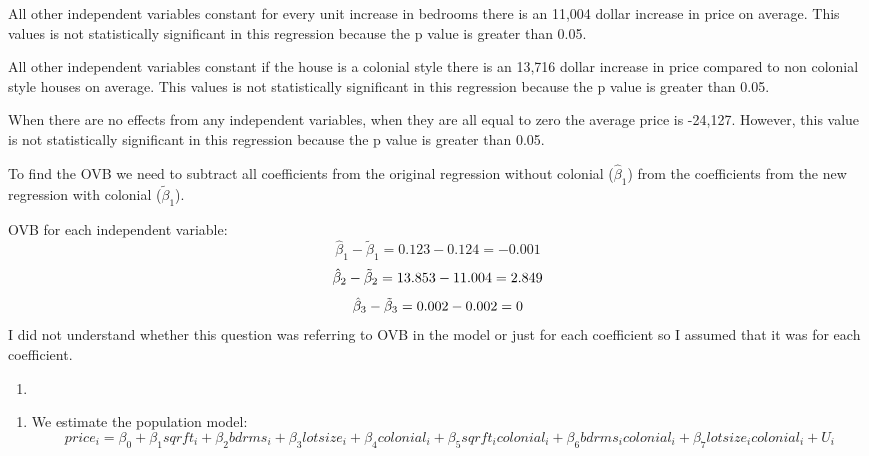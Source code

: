 \documentclass[
  12pt,
  landscape]{article}
\providecommand{\tightlist}{%
  \setlength{\itemsep}{0pt}\setlength{\parskip}{0pt}}
\begin{document}
All other independent variables constant for every unit increase in
bedrooms there is an 11,004 dollar increase in price on average. This
values is not statistically significant in this regression because the p
value is greater than 0.05.

All other independent variables constant if the house is a colonial
style there is an 13,716 dollar increase in price compared to non
colonial style houses on average. This values is not statistically
significant in this regression because the p value is greater than 0.05.

When there are no effects from any independent variables, when they are
all equal to zero the average price is -24,127. However, this value is
not statistically significant in this regression because the p value is
greater than 0.05.

To find the OVB we need to subtract all coefficients from the original
regression without colonial (\(\hat\beta_1\)) from the coefficients from
the new regression with colonial (\(\tilde\beta_1\)).

OVB for each independent variable: \[
\hat\beta_1- \tilde\beta_1 =  0.123 - 0.124 = -0.001
\] \[
\hat\beta_2- \tilde\beta_2 = 13.853 - 11.004 = 2.849 \\
\] \[
\hat\beta_3- \tilde\beta_3 = 0.002 -0.002 = 0\\
\] I did not understand whether this question was referring to OVB in
the model or just for each coefficient so I assumed that it was for each
coefficient.

\begin{enumerate}
\def\labelenumi{(\alph{enumi})}
\setcounter{enumi}{5}
\item
\end{enumerate}

\begin{enumerate}
\def\labelenumi{\roman{enumi})}
\tightlist
\item
  We estimate the population model: \[
  price_i = \beta_0 + \beta_1sqrft_i + \beta_2bdrms_i + \beta_3lotsize_i +\beta_4colonial_i + \beta_5sqrft_icolonial_i + \beta_6bdrms_icolonial_i + \beta_7lotsize_icolonial_i + U_i
  \]
\end{enumerate}
\end{document}

